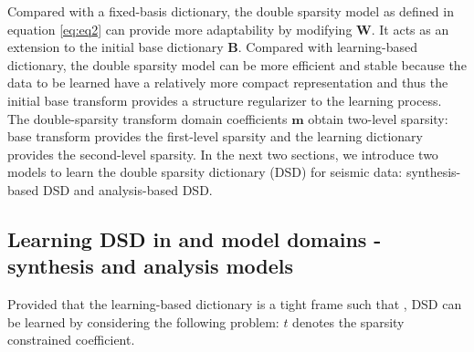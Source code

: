 Compared with a fixed-basis dictionary, the double sparsity model as defined in equation \ref{eq:eq2} can provide more adaptability by modifying $\mathbf{W}$. It acts as an extension to the initial base dictionary $\mathbf{B}$. Compared with learning-based dictionary, the double sparsity model can be more efficient and stable because the data to be learned have a relatively more compact representation and thus the initial base transform provides a structure regularizer to the learning process. The double-sparsity transform domain coefficients $\mathbf{m}$ obtain two-level sparsity: base transform provides the first-level sparsity and the learning dictionary provides the second-level sparsity.   In the next two sections, we introduce two models to learn the double sparsity dictionary (DSD) for seismic data: synthesis-based DSD and analysis-based DSD.

\subsection{Learning DSD in  and model domains - synthesis and analysis models}
Provided that the learning-based dictionary is a tight frame such that ,
DSD can be learned by considering the following problem:
 $t$ denotes the sparsity constrained coefficient.

